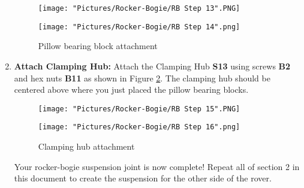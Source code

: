 \documentclass[12pt]{article}
\begin{document}
\begin{enumerate}
\begin{figure}[H]
  \centering
  \begin{minipage}[b]{0.45\textwidth}
    \texttt{[image: "Pictures/Rocker-Bogie/RB Step 13".PNG]}
  \end{minipage}
  \hfill
  \begin{minipage}[b]{0.45\textwidth}
    \texttt{[image: "Pictures/Rocker-Bogie/RB Step 14".png]}
  \end{minipage}
  \caption{Pillow bearing block attachment}
  \label{pillow bearing block}
\end{figure}

\item \textbf{Attach Clamping Hub:} Attach the Clamping Hub \textbf{S13} using screws \textbf{B2} and hex nuts \textbf{B11} as shown in Figure \ref{clamping hub}. The clamping hub should be centered above where you just placed the pillow bearing blocks.

\begin{figure}[H]
  \centering
  \begin{minipage}[b]{0.45\textwidth}
    \texttt{[image: "Pictures/Rocker-Bogie/RB Step 15".PNG]}
  \end{minipage}
  \hfill
  \begin{minipage}[b]{0.45\textwidth}
    \texttt{[image: "Pictures/Rocker-Bogie/RB Step 16".png]}
  \end{minipage}
  \caption{Clamping hub attachment}
  \label{clamping hub}
\end{figure}

Your rocker-bogie suspension joint is now complete!  Repeat all of section 2 in this document to create the suspension for the other side of the rover.


\end{enumerate}
\end{document}
